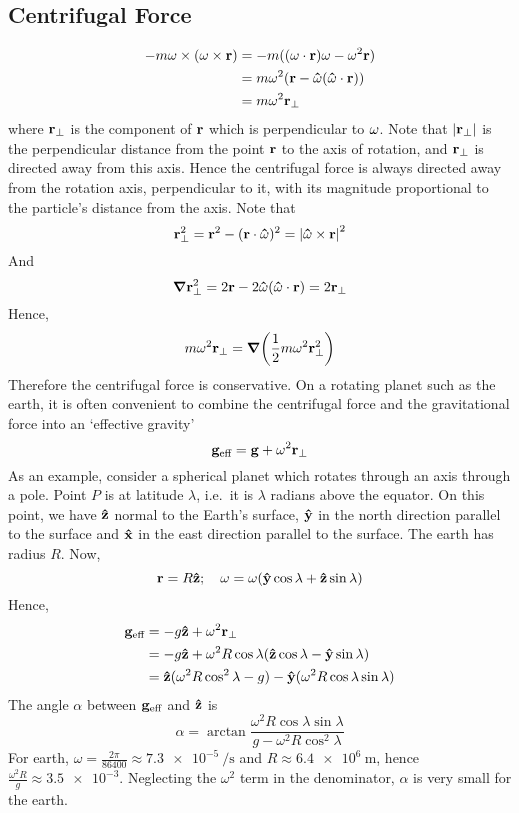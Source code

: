 \subsection{Centrifugal Force}
\begin{align*}
	-m\vb\omega \times (\vb\omega \times \vb r) & = -m((\vb\omega \cdot \vb r)\vb\omega - \vb\omega^2\vb r) \\
	                                            & = m\omega^2(\vb r - \vu\omega(\vu\omega \cdot \vb r))     \\
	                                            & = m\omega^2 \vb r_\perp
\end{align*}
where \(\vb r_\perp\) is the component of \(\vb r\) which is perpendicular to \(\vb\omega\). Note that \(\abs{\vb r_\perp}\) is the perpendicular distance from the point \(\vb r\) to the axis of rotation, and \(\vb r_\perp\) is directed away from this axis. Hence the centrifugal force is always directed away from the rotation axis, perpendicular to it, with its magnitude proportional to the particle's distance from the axis. Note that
\[ \vb r_\perp^2 = \vb r^2 - (\vb r \cdot \vu\omega)^2 = \abs{\vu\omega \times \vb r}^2 \]
And
\[ \grad \vb r_\perp^2 = 2\vb r - 2\vu\omega(\vu\omega \cdot \vb r) = 2\vb r_\perp \]
Hence,
\[ m\omega^2\vb r_\perp = \grad(\frac{1}{2}m\omega^2\vb r_\perp^2) \]
Therefore the centrifugal force is conservative. On a rotating planet such as the earth, it is often convenient to combine the centrifugal force and the gravitational force into an `effective gravity'
\[ \vb g_{\text{eff}} = \vb g + \omega^2 \vb r_\perp \]
As an example, consider a spherical planet which rotates through an axis through a pole. Point \(P\) is at latitude \(\lambda\), i.e.\ it is \(\lambda\) radians above the equator. On this point, we have \(\vu z\) normal to the Earth's surface, \(\vu y\) in the north direction parallel to the surface and \(\vu x\) in the east direction parallel to the surface. The earth has radius \(R\). Now,
\[ \vb r = R\vu z;\quad \vb\omega = \omega(\vu y \cos\lambda + \vu z \sin\lambda) \]
Hence,
\begin{align*}
	\vb g_\text{eff} & = -g\vu z + \omega^2 \vb r_\perp                                              \\
	                 & = -g\vu z + \omega^2 R\cos\lambda (\vu z \cos\lambda - \vu y \sin\lambda)     \\
	                 & = \vu z(\omega^2 R\cos^2\lambda - g) - \vu y(\omega^2R\cos\lambda\sin\lambda)
\end{align*}
The angle \(\alpha\) between \(\vb g_\text{eff}\) and \(\vu z\) is
\[ \alpha = \arctan \frac{\omega^2R\cos\lambda\sin\lambda}{g - \omega^2R\cos^2\lambda} \]
For earth, \(\omega = \frac{2\pi}{86400} \approx \SI{7.3e-5}{\per\second}\) and \(R \approx \SI{6.4e6}{\metre}\), hence \(\frac{\omega^2R}{g} \approx \num{3.5e-3}\). Neglecting the \(\omega^2\) term in the denominator, \(\alpha\) is very small for the earth.

